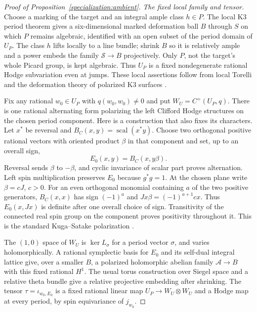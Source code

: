 \documentclass[11pt]{amsart}
\theoremstyle{definition}
\theoremstyle{remark}
\numberwithin{equation}{section}
\begin{document}
\begin{proof}[Proof of Proposition~\ref{specialization:ambient}]
\emph{The fixed local family and tensor.}
Choose a marking of the target and an integral ample class $h\in P$.
The local K3 period theorem gives a six-dimensional marked deformation
ball $B$ through $S$ on which $P$ remains algebraic, identified with
an open subset of the period domain of $U_P$.  The class $h$ lifts
locally to a line bundle; shrink $B$ so it is relatively ample and
a power embeds the family $\mathcal S\to B$ projectively.  Only $P$,
not the target's whole Picard group, is kept algebraic.  Thus $U_P$
is a fixed nondegenerate rational Hodge subvariation even at jumps.
These local assertions follow from local Torelli and the deformation
theory of polarized K3 surfaces \cite{Huybrechts}.

Fix any rational $w_0\in U_P$ with $q(w_0,w_0)\ne0$ and put
$W_U=C^+(U_P,q)$.  There is one rational alternating form polarizing
the left Clifford Hodge structures on the chosen period component.
Here is a construction that also fixes its characters.  Let $x^*$ be
reversal and $B_C(x,y)=\operatorname{scal}(x^*y)$.  Choose two
orthogonal positive rational vectors with oriented product $\beta$
in that component and set, up to an overall sign,
\[
 E_0(x,y)=B_C(x,y\beta).
\]
Reversal sends $\beta$ to $-\beta$, and cyclic invariance of scalar
part proves alternation.  Left spin multiplication preserves $E_0$
because $g^*g=1$.  At the chosen plane write $\beta=cJ$, $c>0$.
For an even orthogonal monomial containing $a$ of the two positive
generators, $B_C(x,x)$ has sign $(-1)^a$ and
$Jx\beta=(-1)^{a+1}cx$.  Thus $E_0(x,Jx)$ is definite after one
overall choice of sign.  Transitivity of the connected real spin
group on the component proves positivity throughout it.  This is the
standard Kuga--Satake polarization \cite{KS}.

The $(1,0)$ space of $W_U$ is $\ker L_\sigma$ for a period vector
$\sigma$, and varies holomorphically.  A rational symplectic basis for
$E_0$ and its self-dual integral lattice give, over a smaller $B$, a
polarized holomorphic abelian family $\mathcal A\to B$ with this fixed
rational $H^1$.  The usual torus construction over Siegel space and a
relative theta bundle give a relative projective embedding after
shrinking.  The tensor $\tau=\iota_{w_0,E_0}$ is a fixed rational
linear map $U_P\to W_U\otimes W_U$ and a Hodge map at every period,
by spin equivariance of $j_{w_0}$.


\end{proof}
\end{document}
